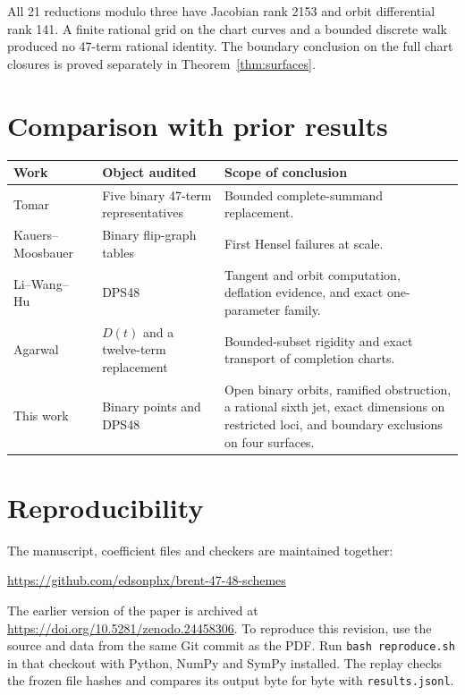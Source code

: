 \documentclass[11pt,reqno]{amsart}
\begin{document}
All 21 reductions modulo three have Jacobian rank 2153 and orbit differential rank 141. A finite rational grid on the chart curves and a bounded discrete walk produced no 47-term rational identity. The boundary conclusion on the full chart closures is proved separately in Theorem~\ref{thm:surfaces}.
\section{Comparison with prior results}
\begin{center}
\small
\begin{tabularx}{\textwidth}{@{}>{\raggedright\arraybackslash}p{}>{\raggedright\arraybackslash}X>{\raggedright\arraybackslash}X@{}}
\toprule
Work & Object audited & Scope of conclusion\\
\midrule
Tomar~\cite{tomar} & Five binary 47-term representatives & Bounded complete-summand replacement.\\
Kauers--Moosbauer~\cite{km} & Binary flip-graph tables & First Hensel failures at scale.\\
Li--Wang--Hu~\cite{lwh} & DPS48 & Tangent and orbit computation, deflation evidence, and exact one-parameter family.\\
Agarwal~\cite{agarwal} & \(D(t)\) and a twelve-term replacement & Bounded-subset rigidity and exact transport of completion charts.\\
This work & Binary points and DPS48 & Open binary orbits, ramified obstruction, a rational sixth jet, exact dimensions on restricted loci, and boundary exclusions on four surfaces.\\
\bottomrule
\end{tabularx}
\end{center}

\section{Reproducibility}
The manuscript, coefficient files and checkers are maintained together:
\begin{center}
\url{https://github.com/edsonphx/brent-47-48-schemes}
\end{center} The earlier version of the paper is archived at \url{https://doi.org/10.5281/zenodo.24458306}. To reproduce this revision, use the source and data from the same Git commit as the PDF. Run \texttt{bash reproduce.sh} in that checkout with Python, NumPy and SymPy installed. The replay checks the frozen file hashes and compares its output byte for byte with \texttt{results.jsonl}.
\end{document}
